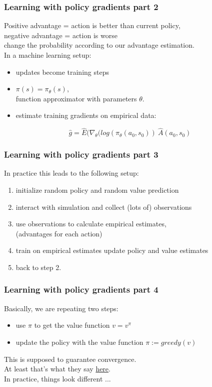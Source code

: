\documentclass{beamer}
\begin{document}
\begin{frame}
\frametitle{Learning with policy gradients part 2}
Positive advantage = action is better than current policy,\\
negative advantage = action is worse\\
\hspace{0.3cm} \textrightarrow  \hspace{0.3cm} change the probability according to our advantage estimation.\\
\bigskip
In a machine learning setup:
\begin{itemize}
    \item updates become training steps
    \item \(\pi(s) = \pi_\theta(s)\), \\
        function approximator with parameters \(\theta\).
    \item estimate training gradients on empirical data:
\end{itemize}
\bigskip
\begin{large}
\[\hat{g}= \hat{E}(\nabla_\theta (log(\pi_\theta(a_0, s_0)) \: \hat{A}(a_0, s_0)\]
\end{large}
\end{frame}

\begin{frame}
\frametitle{Learning with policy gradients part 3}
In practice this leads to the following setup:
\begin{enumerate}
\item initialize random policy and random value prediction
\item interact with simulation and collect (lots of) observations
\item use observations to calculate empirical estimates,\\
      (advantages for each action)
\item train on empirical estimates \textrightarrow \hspace{0.2cm} update policy and value estimates
\item back to step 2.
\end{enumerate}
\end{frame}


\begin{frame}
\frametitle{Learning with policy gradients part 4}
Basically, we are repeating two steps:
\begin{itemize}
    \item use $\pi$ to get the value function $ v = v^\pi$
    \item update the policy with the value function $\pi := greedy(v)$
\end{itemize}
\bigskip
This is supposed to guarantee convergence. \\
At least that's what they say \href{http://www0.cs.ucl.ac.uk/staff/d.silver/web/Teaching_files/DP.pdf}{here}.\\
\bigskip
In practice, things look different ...
\end{frame}
\end{document}

